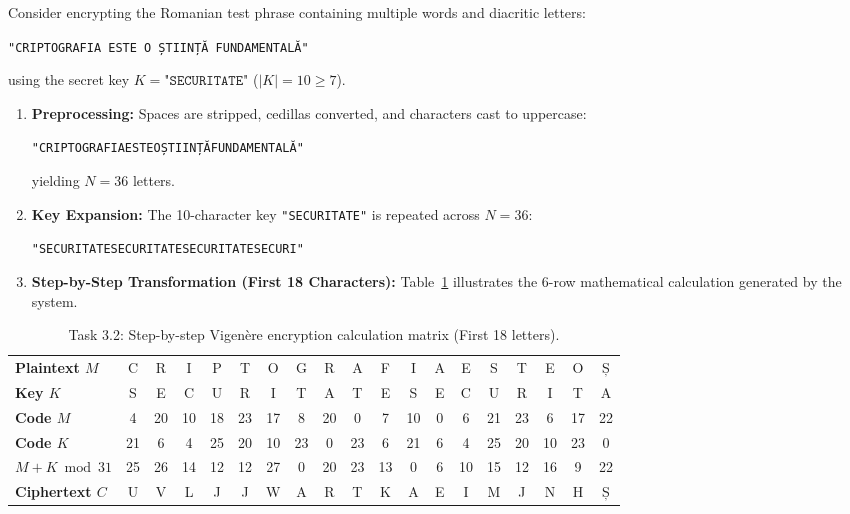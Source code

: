 \documentclass{labreport}
\begin{document}
Consider encrypting the Romanian test phrase containing multiple words and diacritic letters:
\begin{center}
    \texttt{"CRIPTOGRAFIA ESTE O ȘTIINȚĂ FUNDAMENTALĂ"}
\end{center}
using the secret key $K = \texttt{"SECURITATE"}$ ($|K| = 10 \ge 7$).

\begin{enumerate}[leftmargin=*]
    \item \textbf{Preprocessing:} Spaces are stripped, cedillas converted, and characters cast to uppercase:
    \begin{center}
        \texttt{"CRIPTOGRAFIAESTEOȘTIINȚĂFUNDAMENTALĂ"}
    \end{center}
    yielding $N = 36$ letters.
    \item \textbf{Key Expansion:} The 10-character key \texttt{"SECURITATE"} is repeated across $N = 36$:
    \begin{center}
        \texttt{"SECURITATESECURITATESECURITATESECURI"}
    \end{center}
    \item \textbf{Step-by-Step Transformation (First 18 Characters):}
    Table~\ref{tab:exec_table} illustrates the 6-row mathematical calculation generated by the system.
\end{enumerate}

\begin{table}[H]
\centering
\scriptsize
\setlength{\tabcolsep}{3.2pt}
\caption{Task 3.2: Step-by-step Vigenère encryption calculation matrix (First 18 letters).}
\label{tab:exec_table}
\begin{tabular}{lcccccccccccccccccc}
\toprule
\textbf{Plaintext $M$} & C & R & I & P & T & O & G & R & A & F & I & A & E & S & T & E & O & Ș \\
\textbf{Key $K$}       & S & E & C & U & R & I & T & A & T & E & S & E & C & U & R & I & T & A \\
\midrule
\textbf{Code $M$}      & 4 & 20 & 10 & 18 & 23 & 17 & 8 & 20 & 0 & 7 & 10 & 0 & 6 & 21 & 23 & 6 & 17 & 22 \\
\textbf{Code $K$}      & 21 & 6 & 4 & 25 & 20 & 10 & 23 & 0 & 23 & 6 & 21 & 6 & 4 & 25 & 20 & 10 & 23 & 0 \\
\midrule
\textbf{$M+K \bmod 31$}& 25 & 26 & 14 & 12 & 12 & 27 & 0 & 20 & 23 & 13 & 0 & 6 & 10 & 15 & 12 & 16 & 9 & 22 \\
\textbf{Ciphertext $C$}& U & V & L & J & J & W & A & R & T & K & A & E & I & M & J & N & H & Ș \\
\bottomrule
\end{tabular}
\end{table}
\end{document}
